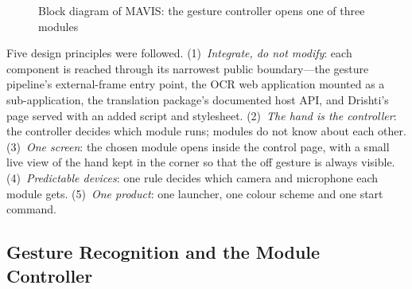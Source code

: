 \documentclass[12pt,singleside,a4paper]{article}
\begin{document}
\begin{figure}[H]
\caption{Block diagram of MAVIS: the gesture controller opens one of three modules}
\label{fig:arch}
\end{figure}

Five design principles were followed. (1)~\emph{Integrate, do not modify}: each component is reached through its narrowest public boundary---the gesture pipeline's external-frame entry point, the OCR web application mounted as a sub-application, the translation package's documented host API, and Drishti's page served with an added script and stylesheet. (2)~\emph{The hand is the controller}: the controller decides which module runs; modules do not know about each other. (3)~\emph{One screen}: the chosen module opens inside the control page, with a small live view of the hand kept in the corner so that the off gesture is always visible. (4)~\emph{Predictable devices}: one rule decides which camera and microphone each module gets. (5)~\emph{One product}: one launcher, one colour scheme and one start command.

\subsection{Gesture Recognition and the Module Controller}
\end{document}
